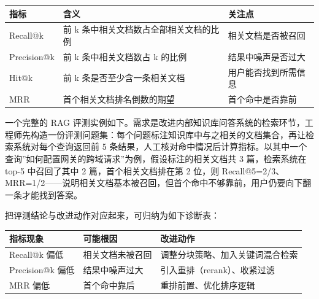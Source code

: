 \documentclass[12pt,a4paper,twoside,openany]{ctexbook}
\numberwithin{figure}{chapter}
\numberwithin{table}{chapter}
\newcounter{none}
\begin{document}
{\def\LTcaptype{none} %
\begin{longtable}[]{@{}
  >{\raggedright\arraybackslash}p{}
  >{\raggedright\arraybackslash}p{}
  >{\raggedright\arraybackslash}p{}@{}}
\toprule\noalign{}
\begin{minipage}[b]{\linewidth}\raggedright
指标
\end{minipage} & \begin{minipage}[b]{\linewidth}\raggedright
含义
\end{minipage} & \begin{minipage}[b]{\linewidth}\raggedright
关注点
\end{minipage} \\
\midrule\noalign{}
\endhead
\bottomrule\noalign{}
\endlastfoot
Recall@k & 前 k 条中相关文档数占全部相关文档的比例 &
相关文档是否被召回 \\
Precision@k & 前 k 条中相关文档数占 k 的比例 & 结果中噪声是否过大 \\
Hit@k & 前 k 条是否至少含一条相关文档 & 用户能否找到所需信息 \\
MRR & 首个相关文档排名倒数的期望 & 首个命中是否靠前 \\
\end{longtable}
}

一个完整的 RAG
评测实例如下。需求是改进内部知识库问答系统的检索环节，工程师先构造一份评测问题集：每个问题标注知识库中与之相关的文档集合，再让检索系统对每个查询返回前
5
条结果，人工核对命中情况后计算指标。以其中一个查询''如何配置网关的跨域请求''为例，假设标注的相关文档共
3 篇，检索系统在 top-5 中召回了其中 2 篇，首个相关文档排在第 2 位，则
Recall@5=2/3、MRR=1/2------说明相关文档基本被召回，但首个命中不够靠前，用户仍要向下翻一条才能找到答案。

把评测结论与改进动作对应起来，可归纳为如下诊断表：

{\def\LTcaptype{none} %
\begin{longtable}[]{@{}lll@{}}
\toprule\noalign{}
指标现象 & 可能根因 & 改进动作 \\
\midrule\noalign{}
\endhead
\bottomrule\noalign{}
\endlastfoot
Recall@k 偏低 & 相关文档未被召回 & 调整分块策略、加入关键词混合检索 \\
Precision@k 偏低 & 结果中噪声过大 & 引入重排（rerank）、收紧过滤 \\
MRR 偏低 & 首个命中靠后 & 重排前置、优化排序逻辑 \\
\end{longtable}
}
\end{document}
